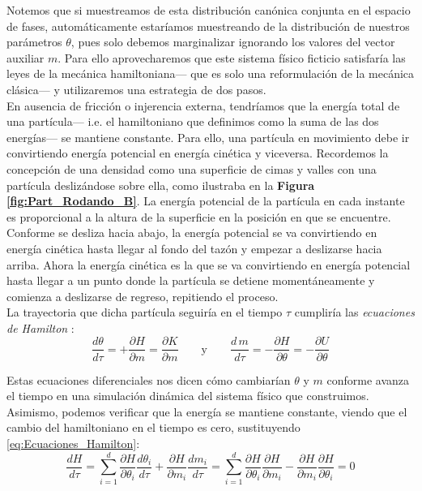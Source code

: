  Notemos que si muestreamos de esta distribución canónica conjunta en el espacio de fases, automáticamente estaríamos muestreando de la distribución de nuestros parámetros $\theta$, pues solo debemos marginalizar ignorando los valores del vector auxiliar $m$. Para ello aprovecharemos que este sistema físico ficticio satisfaría las leyes de la mecánica hamiltoniana--- que es solo una reformulación de la mecánica clásica--- y utilizaremos una estrategia de dos pasos.\\ 
 
 En ausencia de fricción o injerencia externa, tendríamos que la energía total de una partícula--- i.e. el hamiltoniano que definimos como la suma de las dos energías--- se mantiene constante. Para ello, una partícula en movimiento debe ir convirtiendo energía potencial en energía cinética y viceversa. Recordemos la concepción de una densidad como una superficie de cimas y valles con una partícula deslizándose sobre ella, como ilustraba en la \textbf{Figura \ref{fig:Part_Rodando_B}}. La energía potencial de la partícula en cada instante es proporcional a la altura de la superficie en la posición en que se encuentre. Conforme se desliza hacia abajo, la energía potencial se va convirtiendo en energía cinética hasta llegar al fondo del tazón y empezar a deslizarse hacia arriba. Ahora la energía cinética es la que se va convirtiendo en energía potencial hasta llegar a un punto donde la partícula se detiene momentáneamente y comienza a deslizarse de regreso, repitiendo el proceso.\\ 
 
 La trayectoria que dicha partícula seguiría en el tiempo $\tau$ cumpliría las \textit{ecuaciones de Hamilton} \parencites{Neal93,Neal11,Betancourt17}: 
 \begin{equation}
 \label{eq:Ecuaciones_Hamilton}
 \dfrac{d\theta}{d\tau}=+\dfrac{\partial H}{\partial m} = \dfrac{\partial K}{\partial m} \qquad \text{y} \qquad \dfrac{d\,m}{d\tau}=-\dfrac{\partial H}{\partial \theta} = -\dfrac{\partial U}{\partial \theta}
 \end{equation}
 
 Estas ecuaciones diferenciales nos dicen cómo cambiarían $\theta$ y $m$ conforme avanza el tiempo en una simulación dinámica del sistema físico que construimos. Asimismo, podemos verificar que la energía se mantiene constante, viendo que el cambio del hamiltoniano en el tiempo es cero, sustituyendo \eqref{eq:Ecuaciones_Hamilton}:
 \begin{equation*}
 \dfrac{dH}{d\tau} = \sum\limits_{i=1}^d \dfrac{\partial H}{\partial \theta_i}\dfrac{d\theta_i}{d\tau} + \dfrac{\partial H}{\partial m_i}\dfrac{dm_i}{d\tau} = \sum\limits_{i=1}^d \dfrac{\partial H}{\partial \theta_i}\dfrac{\partial H}{\partial m_i} - \dfrac{\partial H}{\partial m_i}\dfrac{\partial H}{\partial \theta_i} = 0
 \end{equation*}
 
